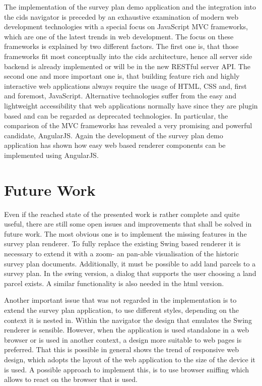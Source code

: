 The implementation of the survey plan demo application and the integration into the cids navigator is preceded by an exhaustive examination of modern web development technologies with a special focus on JavaScript MVC frameworks, which are one of the latest trends in web development. 
The focus on these frameworks is explained by two different factors. 
The first one is, that those frameworks fit most conceptually into the cids architecture, hence all server side backend is already implemented or will be in the new RESTful server API. 
The second one and more important one is, that building feature rich and highly interactive web applications always require the usage of HTML, CSS and, first and foremost, JavaScript. 
Alternative technologies suffer from the easy and lightweight accessibility that web applications normally have since they are plugin based and can be regarded as deprecated technologies. 
In particular, the comparison of the MVC frameworks has revealed a very promising and powerful candidate, AngularJS. 
Again the development of the survey plan demo application has shown how easy web based renderer components can be implemented using AngularJS.  

\newpage

\section{Future Work}

Even if the reached state of the presented work is rather complete and quite useful, there are still some open issues and improvements that shall be solved in future work. 
The most obvious one is to implement the missing features in the survey plan renderer. 
To fully replace the existing Swing based renderer it is necessary to extend it with a zoom- an pan-able visualisation of the historic survey plan documents. 
Additionally, it must be possible to add land parcels to a survey plan. 
In the swing version, a dialog that supports the user choosing a land parcel exists. 
A similar functionality is also needed in the html version.

Another important issue that was not regarded in the implementation is to extend the survey plan application, to use different styles, depending on the context it is nested in.  
Within the navigator the design that emulates the Swing renderer is sensible. 
However, when the application is used standalone in a web browser or is used in another context, a design more suitable to web pages is preferred. 
That this is possible in general shows the trend of responsive web design, which adopts the layout of the web application to the size of the device it is used. 
A possible approach to implement this, is to use browser sniffing which allows to react on the browser that is used.

